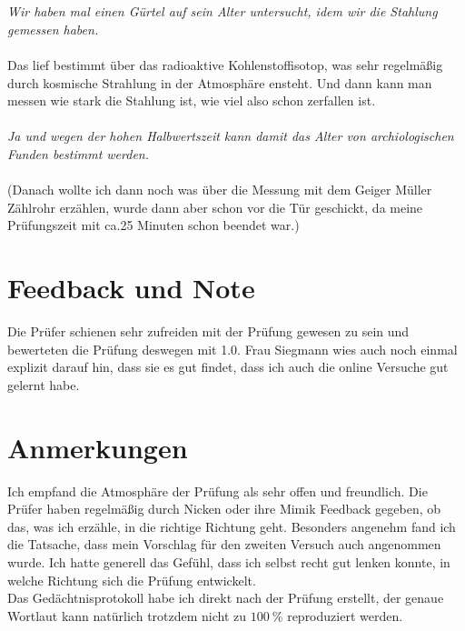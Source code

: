 \\\\\noindent
\textit{Wir haben mal einen Gürtel auf sein Alter untersucht, idem wir die Stahlung gemessen haben.}
\\\\\noindent
Das lief bestimmt über das radioaktive Kohlenstoffisotop, was sehr regelmäßig durch kosmische Strahlung in der Atmosphäre ensteht. Und 
dann kann man messen wie stark die Stahlung ist, wie viel also schon zerfallen ist. 
\\\\\noindent
\textit{Ja und wegen der hohen Halbwertszeit kann damit das Alter von archiologischen Funden bestimmt werden.}
\\\\\noindent
(Danach wollte ich dann noch was über die Messung mit dem Geiger Müller Zählrohr erzählen, wurde dann aber schon vor die Tür geschickt,
da meine Prüfungszeit mit ca.25 Minuten schon beendet war.)

\section{Feedback und Note}
Die Prüfer schienen sehr zufreiden mit der Prüfung gewesen zu sein und bewerteten die Prüfung deswegen mit 1.0. Frau Siegmann wies auch noch
einmal explizit darauf hin, dass sie es gut findet, dass ich auch die online Versuche gut gelernt habe. 

\section{Anmerkungen}
Ich empfand die Atmosphäre der Prüfung als sehr offen und freundlich. Die Prüfer haben regelmäßig durch Nicken oder ihre Mimik Feedback gegeben,
ob das, was ich erzähle, in die richtige Richtung geht. Besonders angenehm fand ich die Tatsache, dass mein Vorschlag für den zweiten 
Versuch auch angenommen wurde. Ich hatte generell das Gefühl, dass ich selbst recht gut lenken konnte, in welche Richtung
sich die Prüfung entwickelt.
\\\noindent
Das Gedächtnisprotokoll habe ich direkt nach der Prüfung erstellt, der genaue Wortlaut kann natürlich trotzdem nicht zu $\SI{100}{\percent}$
reproduziert werden.
